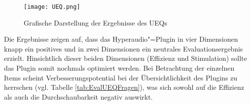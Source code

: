 \begin{figure}[h!]
\texttt{[image: UEQ.png]}
\caption{\label{fig:UEQ}Grafische Darstellung der Ergebnisse des UEQs}
\end{figure}

Die Ergebnisse zeigen auf, dass das Hyperaudio"=Plugin in vier Dimensionen knapp ein positives und in zwei Dimensionen ein neutrales Evaluationsergebnis erzielt. Hinsichtlich dieser beiden Dimensionen (Effizienz und Stimulation) sollte das Plugin somit nochmals optimiert werden. Bei Betrachtung der einzelnen Items scheint Verbesserungspotential bei der Übersichtlichkeit des Plugins zu herrschen (vgl. Tabelle \ref{tab:EvalUEQFragen}), was sich sowohl auf die Effizienz als auch die Durchschaubarkeit negativ auswirkt.

